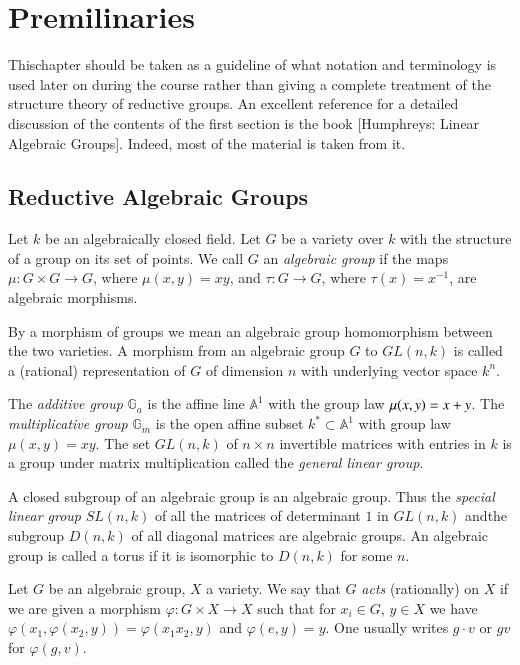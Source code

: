 \chapter{Premilinaries}\label{chap1}

This\pageoriginale chapter should be taken as a guideline of what
notation and terminology is used later on during the course rather
than giving a complete treatment of the structure theory of reductive
groups. An excellent reference for a detailed discussion of the
contents of the first section is the book [Humphreys: Linear Algebraic
  Groups]. Indeed, most of the material is taken from it.


\section{Reductive Algebraic Groups}\label{chap1-sec1.1}

\label{page1}
Let $k$ be an algebraically closed field. Let $G$ be a variety over
$k$ with the structure of a group on its set of points. We call $G$
an {\em algebraic group} if the maps $\mu:G\times G\to G$, where
$\mu(x,y)=xy$, and $\tau:G\to G$, where $\tau(x)=x^{-1}$, are
algebraic morphisms.

By a morphism of groups we mean an algebraic group homomorphism
between the two varieties. A morphism from an algebraic group $G$ to
$GL(n,k)$ is called a (rational) representation of $G$ of dimension
$n$ with underlying vector space $k^{n}$.

The {\em additive group} $\mathbb{G}_{a}$ is the affine line
$\mathbb{A}^{1}$ with the group law $\mu(x,y)\break =x+y$. The {\em
  multiplicative group} $\mathbb{G}_{m}$ is the open affine subset
$k^{\ast}\subset \mathbb{A}^{1}$ with group law $\mu(x,y)=xy$. The set
$GL(n,k)$ of $n\times n$ invertible matrices with entries in $k$ is a
group under matrix multiplication called the {\em general linear
  group}.

A closed subgroup of an algebraic group is an algebraic group. Thus
the {\em special linear group} $SL(n,k)$ of all the matrices of
determinant $1$ in $GL(n,k)$ and\pageoriginale the subgroup $D(n,k)$
of all diagonal matrices are algebraic groups. An algebraic group is
called a torus if it is isomorphic to $D(n,k)$ for some $n$.

\label{page2}

Let $G$ be an algebraic group, $X$ a variety. We say that $G$ {\em
  acts} (rationally) on $X$ if we are given a morphism
$\varphi:G\times X\to X$ such that for $x_{i}\in G$, $y\in X$ we have
$\varphi(x_{1},\varphi(x_{2},y))=\varphi(x_{1}x_{2},y)$ and
$\varphi(e,y)=y$. One usually writes $g\cdot v$ or $gv$ for
$\varphi(g,v)$.

